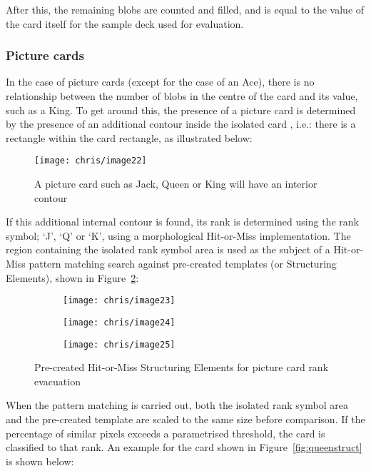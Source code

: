 			After this, the remaining blobs are counted and filled, and is equal to the value of the card itself for the sample deck used for evaluation.

		\subsubsection{Picture cards}
			In the case of picture cards (except for the case of an Ace), there is no relationship between the number of blobs in the centre of the card and its value, such as a King. To get around this, the presence of a picture card is determined by the presence of an additional contour inside the isolated card , i.e.: there is a rectangle within the card rectangle, as illustrated below:

			\begin{figure}[H]
				\centering
				\texttt{[image: chris/image22]}
				\caption{A picture card such as Jack, Queen or King will have an interior contour}
				\label{fig:innercont}
			\end{figure}

			If this additional internal contour is found, its rank is determined using the rank symbol; `J', `Q' or `K', using a morphological Hit-or-Miss implementation. The region containing the isolated rank symbol area is used as the subject of a Hit-or-Miss pattern matching search against pre-created templates (or Structuring Elements), shown in Figure~\ref{fig:picstruct}:

			\begin{figure}[H]
				\centering
				\begin{subfigure}[b]{0.14\textwidth}
					\centering
					\texttt{[image: chris/image23]}
					\caption{}
				\end{subfigure}
				\begin{subfigure}[b]{0.15\textwidth}
					\centering
					\texttt{[image: chris/image24]}
					\caption{}
				\end{subfigure}
				\begin{subfigure}[b]{0.14\textwidth}
					\centering
					\texttt{[image: chris/image25]}
					\caption{}
				\end{subfigure}
				\caption{Pre-created Hit-or-Miss Structuring Elements for picture card rank evacuation}
				\label{fig:picstruct}
			\end{figure}

			When the pattern matching is carried out, both the isolated rank symbol area and the pre-created template are scaled to the same size before comparison. If the percentage of similar pixels exceeds a parametrised threshold, the card is classified to that rank. An example for the card shown in Figure~\ref{fig:queenstruct} is shown below:

